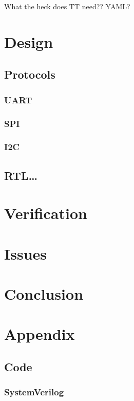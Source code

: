 \documentclass[a4paper]{report}
\begin{document}
				What the heck does TT need?? YAML?

	\chapter{Design}
		
		\section{Protocols}

			\subsection{UART}

			\subsection{SPI}

			\subsection{I2C}

		\section{RTL\ldots}

	\chapter{Verification}

	\chapter{Issues}

	\chapter{Conclusion}

	\chapter{Appendix}

		\section{Code}

			\subsection{SystemVerilog}
\end{document}
